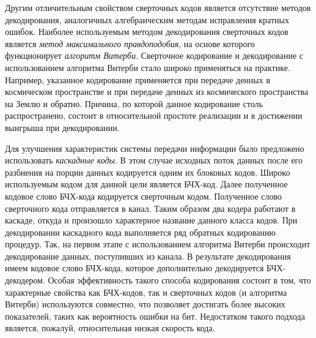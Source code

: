 Другим отличительным свойством сверточных кодов является отсутствие методов декодирования, аналогичных 
алгебраическим методам исправления кратных ошибок. Наиболее используемым методом декодирования 
сверточных кодов является \textit{метод максимального правдоподобия}, на основе которого функционирует 
\textit{алгоритм Витерби}. Сверточное кодирование и декодирование с использованием алгоритма Витерби 
стало широко применяться на практике. Например, указанное кодирование применяется при передаче денных в 
космическом пространстве и при передаче денных из космического пространства на Землю и обратно. 
Причина, по которой данное кодирование столь распространено, состоит в относительной простоте 
реализации и в достижении выигрыша при декодировании.

Для улучшения характеристик системы передачи информации было предложено использовать \textit{каскадные 
коды}. В этом случае исходных поток данных после его разбиения на порции данных кодируется одним их 
блоковых кодов. Широко используемым кодом для данной цели является БЧХ-код. Далее полученное кодовое 
слово БЧХ-кода кодируется сверточным кодом. Полученное слово сверточного кода отправляется в канал. 
Таким образом два кодера работают в каскаде, откуда и произошло характерное название данного класса 
кодов. При декодировании каскадного кода выполняется ряд обратных кодированию процедур. Так, на первом 
этапе с использованием алгоритма Витерби происходит декодирование данных, поступивших из канала. В 
результате декодирования имеем кодовое слово БЧХ-кода, которое дополнительно декодируется БЧХ-
декодером. Особая эффективность такого способа кодирования состоит в том, что характерные свойства как 
БЧХ-кодов, так и сверточных кодов (и алгоритма Витерби) используются совместно, что позволяет достигать 
более высоких показателей, таких как вероятность ошибки на бит. Недостатком такого подхода является, 
пожалуй, относительная низкая скорость кода.